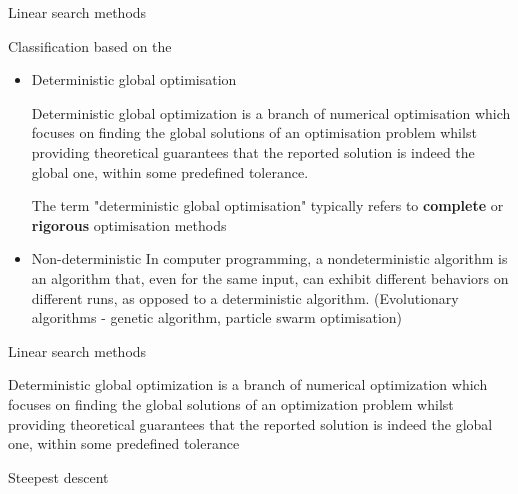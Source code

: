 \documentclass[10pt,aspectratio=169,notes]{beamer} %
\begin{document}
\begin{frame}{Linear search methods}
	
\end{frame}
\note{}
\begin{frame}{Classification  based on the }
\begin{itemize}
	\item Deterministic global optimisation
		
	Deterministic global optimization is a branch of numerical optimisation which focuses on finding the global solutions of an optimisation problem whilst providing theoretical guarantees that the reported solution is indeed the global one, within some predefined tolerance. 
	
	The term "deterministic global optimisation" typically refers to \textbf{complete} or \textbf{rigorous} optimisation methods
	\item Non-deterministic
	In computer programming, a nondeterministic algorithm is an algorithm that, even for the same input, can exhibit different behaviors on different runs, as opposed to a deterministic algorithm.
	(Evolutionary algorithms - genetic algorithm, particle swarm optimisation)
\end{itemize}
\end{frame}
\begin{frame}{Linear search methods}
	
\end{frame}
\note{}
Deterministic global optimization is a branch of numerical optimization which focuses on finding the global solutions of an optimization problem whilst providing theoretical guarantees that the reported solution is indeed the global one, within some predefined tolerance
\begin{frame}{Steepest descent}
	
\end{frame}
\note{}
\end{document}
